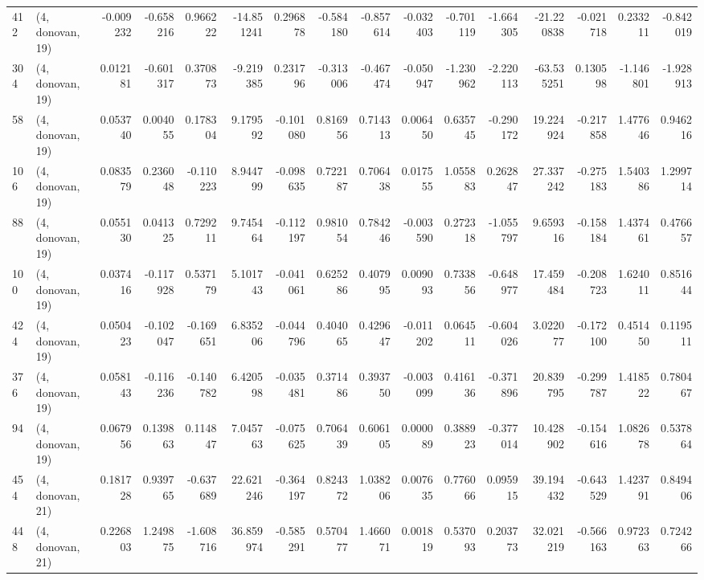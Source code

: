 \begin{tabular}{llrrrrrrrrrrrrrr}
412 &  (4, donovan, 19) &  -0.009232 & -0.658216 &  0.966222 &  -14.851241 &  0.296878 &  -0.584180 & -0.857614 & -0.032403 & -0.701119 & -1.664305 &  -21.220838 & -0.021718 &  0.233211 & -0.842019 \\
304 &  (4, donovan, 19) &   0.012181 & -0.601317 &  0.370873 &   -9.219385 &  0.231796 &  -0.313006 & -0.467474 & -0.050947 & -1.230962 & -2.220113 &  -63.535251 &  0.130598 & -1.146801 & -1.928913 \\
58  &  (4, donovan, 19) &   0.053740 &  0.004055 &  0.178304 &    9.179592 & -0.101080 &   0.816956 &  0.714313 &  0.006450 &  0.635745 & -0.290172 &   19.224924 & -0.217858 &  1.477646 &  0.946216 \\
106 &  (4, donovan, 19) &   0.083579 &  0.236048 & -0.110223 &    8.944799 & -0.098635 &   0.722187 &  0.706438 &  0.017555 &  1.055883 &  0.262847 &   27.337242 & -0.275183 &  1.540386 &  1.299714 \\
88  &  (4, donovan, 19) &   0.055130 &  0.041325 &  0.729211 &    9.745464 & -0.112197 &   0.981054 &  0.784246 & -0.003590 &  0.272318 & -1.055797 &    9.659316 & -0.158184 &  1.437461 &  0.476657 \\
100 &  (4, donovan, 19) &   0.037416 & -0.117928 &  0.537179 &    5.101743 & -0.041061 &   0.625286 &  0.407995 &  0.009093 &  0.733856 & -0.648977 &   17.459484 & -0.208723 &  1.624011 &  0.851644 \\
424 &  (4, donovan, 19) &   0.050423 & -0.102047 & -0.169651 &    6.835206 & -0.044796 &   0.404065 &  0.429647 & -0.011202 &  0.064511 & -0.604026 &    3.022077 & -0.172100 &  0.451450 &  0.119511 \\
376 &  (4, donovan, 19) &   0.058143 & -0.116236 & -0.140782 &    6.420598 & -0.035481 &   0.371486 &  0.393750 & -0.003099 &  0.416136 & -0.371896 &   20.839795 & -0.299787 &  1.418522 &  0.780467 \\
94  &  (4, donovan, 19) &   0.067956 &  0.139863 &  0.114847 &    7.045763 & -0.075625 &   0.706439 &  0.606105 &  0.000089 &  0.388923 & -0.377014 &   10.428902 & -0.154616 &  1.082678 &  0.537864 \\
454 &  (4, donovan, 21) &   0.181728 &  0.939765 & -0.637689 &   22.621246 & -0.364197 &   0.824372 &  1.038206 &  0.007635 &  0.776066 &  0.095915 &   39.194432 & -0.643529 &  1.423791 &  0.849406 \\
448 &  (4, donovan, 21) &   0.226803 &  1.249875 & -1.608716 &   36.859974 & -0.585291 &   0.570477 &  1.466071 &  0.001819 &  0.537093 &  0.203773 &   32.021219 & -0.566163 &  0.972363 &  0.724266 \\

\end{tabular}
